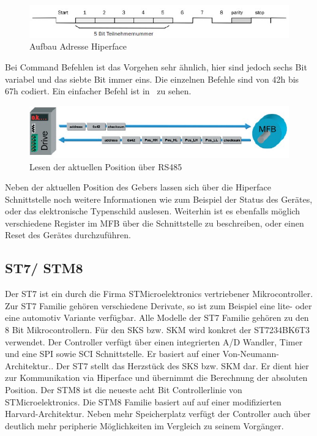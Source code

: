  \begin{figure}[h]
  \centering
   \includegraphics[width=1\textwidth]{img/Teilnehmernummer.jpg} 
   \caption[Aufbau Adresse Hiperface]{Aufbau Adresse Hiperface \cite{SICKAG.2016}}
   \label{fig:Teilnehmernummer.jpg}
\end{figure}
 Bei Command Befehlen ist das Vorgehen sehr ähnlich, hier sind jedoch sechs Bit variabel und das siebte Bit immer eins. Die einzelnen Befehle sind von 42h bis 67h codiert. Ein einfacher Befehl ist in \dq {}\dq~zu sehen.
\begin{figure}[h]
  \centering
   \includegraphics[width=1\textwidth]{img/Positionlesen.jpg} 
   \caption[Lesen der aktuellen Position über RS485]{ Lesen der aktuellen Position über RS485  \cite{SICKAG.2016}}
   \label{fig:Positionlesen.jpg}
\end{figure}

Neben der aktuellen Position des Gebers lassen sich über die Hiperface Schnittstelle noch weitere Informationen wie zum Beispiel der Status des Gerätes, oder das elektronische Typenschild auslesen. Weiterhin ist es ebenfalls möglich  verschiedene Register im \ac{MFB} über die Schnittstelle zu beschreiben, oder einen Reset des Gerätes durchzuführen.

\newpage

\subsection{ST7/ STM8}
Der ST7 ist ein durch die Firma STMicroelektronics vertriebener Mikrocontroller. Zur ST7 Familie gehören verschiedene Derivate, so ist zum Beispiel eine lite- oder eine automotiv Variante verfügbar. Alle Modelle der ST7 Familie gehören zu den 8 Bit Mikrocontrollern. Für den SKS bzw. SKM wird konkret der ST7234BK6T3 verwendet. Der Controller verfügt über einen integrierten A/D Wandler, Timer und  eine SPI sowie SCI Schnittstelle. Er basiert auf einer Von-Neumann-Architektur.\cite{STMicroelektronics.2008}. Der ST7 stellt das Herzstück des SKS bzw. SKM dar. Er dient hier zur Kommunikation via Hiperface und übernimmt die Berechnung der absoluten Position. Der STM8 ist die neueste acht Bit Controllerlinie von STMicroelektronics. Die STM8 Familie basiert auf auf einer modifizierten Harvard-Architektur\cite{STMicroelektronics.2017}. Neben mehr Speicherplatz  verfügt der Controller auch über deutlich mehr peripherie Möglichkeiten im Vergleich zu seinem Vorgänger. %
